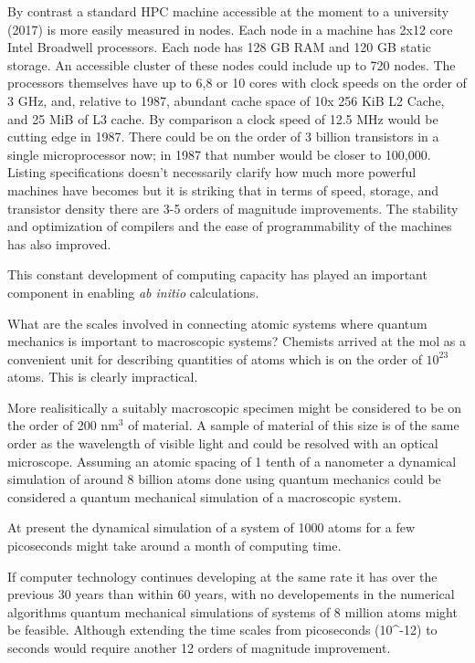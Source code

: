 By contrast a standard HPC machine accessible at the moment to a university (2017) 
is more easily measured in nodes. Each node in a machine has 2x12 core Intel Broadwell processors.
Each node has 128 GB RAM and 120 GB static storage. An accessible 
cluster of these nodes could include up to 720 nodes. The processors themselves have 
up to 6,8 or 10 cores with clock speeds on the order of 3 GHz, and, relative to 1987,
abundant cache space of 10x 256 KiB L2 Cache, and 25 MiB of L3 cache. 
By comparison a clock speed of 12.5 MHz would be cutting edge in 1987. 
There could be on the order of 3 billion transistors in a single microprocessor now;
in 1987 that number would be closer to 100,000. Listing specifications doesn't
necessarily clarify how much more powerful machines have becomes but it is striking
that in terms of speed, storage, and transistor density there are 3-5 orders of magnitude 
improvements. The stability and optimization of compilers and the ease of programmability
of the machines has also improved.

This constant development of computing capacity has played an important component in enabling
{\it ab initio} calculations. 

What are the scales involved in connecting atomic systems where quantum mechanics is important
to macroscopic systems? Chemists arrived at the mol as a convenient unit for describing
quantities of atoms which is on the order of $10^{23}$ atoms. This is clearly impractical.

More realisitically a suitably macroscopic specimen might be considered to be on the 
order of 200 nm$^{3}$ of material. A sample of material of this size is of the 
same order as the wavelength of visible light and could be
resolved with an optical microscope. Assuming an atomic spacing of 1 tenth of a nanometer 
a dynamical simulation of around 8 billion atoms done using quantum mechanics 
could be considered a quantum mechanical simulation of a macroscopic system. 

At present the dynamical simulation of a system of 1000 atoms for a few picoseconds 
might take around a month of computing time. 

If computer technology continues developing at the same rate it has
over the previous 30 years than within 60 years, with no developements in the numerical
algorithms quantum mechanical simulations of systems of
8 million atoms might be feasible. Although extending the time scales from picoseconds
(10^{-12}) to seconds would require another 12 orders of magnitude improvement.

